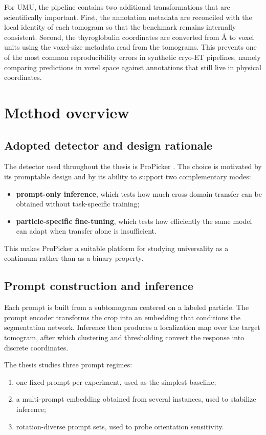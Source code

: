 \documentclass[12pt,a4paper]{report}
\begin{document}
For UMU, the pipeline contains two additional transformations that are scientifically important. First, the annotation metadata are reconciled with the local identity of each tomogram so that the benchmark remains internally consistent. Second, the thyroglobulin coordinates are converted from \AA{} to voxel units using the voxel-size metadata read from the tomograms. This prevents one of the most common reproducibility errors in synthetic cryo-ET pipelines, namely comparing predictions in voxel space against annotations that still live in physical coordinates.

\section{Method overview}

\subsection{Adopted detector and design rationale}
The detector used throughout the thesis is ProPicker \cite{wiedemann2025propicker}. The choice is motivated by its promptable design and by its ability to support two complementary modes:
\begin{itemize}
  \item \textbf{prompt-only inference}, which tests how much cross-domain transfer can be obtained without task-specific training;
  \item \textbf{particle-specific fine-tuning}, which tests how efficiently the same model can adapt when transfer alone is insufficient.
\end{itemize}

This makes ProPicker a suitable platform for studying universality as a continuum rather than as a binary property.

\subsection{Prompt construction and inference}
Each prompt is built from a subtomogram centered on a labeled particle. The prompt encoder transforms the crop into an embedding that conditions the segmentation network. Inference then produces a localization map over the target tomogram, after which clustering and thresholding convert the response into discrete coordinates.

The thesis studies three prompt regimes:
\begin{enumerate}
  \item one fixed prompt per experiment, used as the simplest baseline;
  \item a multi-prompt embedding obtained from several instances, used to stabilize inference;
  \item rotation-diverse prompt sets, used to probe orientation sensitivity.
\end{enumerate}
\end{document}

